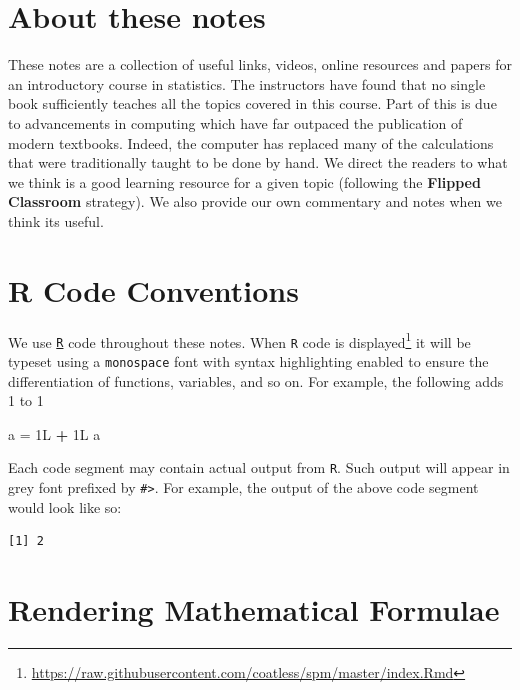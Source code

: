\documentclass[]{book}
\makeatletter
\newenvironment{Shaded}{\begin{snugshade}}{\end{snugshade}}
\newcommand{\StringTok}[1]{\textcolor[rgb]{0.31,0.60,0.02}{#1}}
\newcommand{\OperatorTok}[1]{\textcolor[rgb]{0.81,0.36,0.00}{\textbf{#1}}}
\newcommand{\NormalTok}[1]{#1}
\let\rmarkdownfootnote\footnote%
\def\footnote{\protect\rmarkdownfootnote}
\newenvironment{kframe}{%
\medskip{}
\setlength{\fboxsep}{.8em}
 \def\at@end@of@kframe{}%
 \ifinner\ifhmode%
  \def\at@end@of@kframe{\end{minipage}}%
  \begin{minipage}{\columnwidth}%
 \fi\fi%
 \def\FrameCommand##1{\hskip\@totalleftmargin \hskip-\fboxsep
 \colorbox{shadecolor}{##1}\hskip-\fboxsep
     \hskip-\linewidth \hskip-\@totalleftmargin \hskip\columnwidth}%
 \MakeFramed {\advance\hsize-\width
   \@totalleftmargin\z@ \linewidth\hsize
   \@setminipage}}%
 {\par\unskip\endMakeFramed%
 \at@end@of@kframe}
\renewenvironment{Shaded}{\begin{kframe}}{\end{kframe}}
\theoremstyle{definition}
\theoremstyle{definition}
\theoremstyle{definition}
\theoremstyle{remark}
\makeatother
\begin{document}
\section{About these notes}\label{about-these-notes}

These notes are a collection of useful links, videos, online resources
and papers for an introductory course in statistics. The instructors
have found that no single book sufficiently teaches all the topics
covered in this course. Part of this is due to advancements in computing
which have far outpaced the publication of modern textbooks. Indeed, the
computer has replaced many of the calculations that were traditionally
taught to be done by hand. We direct the readers to what we think is a
good learning resource for a given topic (following the \textbf{Flipped
Classroom} strategy). We also provide our own commentary and notes when
we think its useful.

\section{R Code Conventions}\label{r-code-conventions}

We use \href{https://cran.r-project.org/}{\texttt{R}} code throughout
these notes. When \texttt{R} code is displayed\footnote{\url{https://raw.githubusercontent.com/coatless/spm/master/index.Rmd}}
it will be typeset using a \texttt{monospace} font with syntax
highlighting enabled to ensure the differentiation of functions,
variables, and so on. For example, the following adds 1 to 1

\begin{Shaded}
\begin{Highlighting}[]
\NormalTok{a =}\StringTok{ }\NormalTok{1L }\OperatorTok{+}\StringTok{ }\NormalTok{1L}
\NormalTok{a}
\end{Highlighting}
\end{Shaded}

Each code segment may contain actual output from \texttt{R}. Such output
will appear in grey font prefixed by \texttt{\#\textgreater{}}. For
example, the output of the above code segment would look like so:

\begin{verbatim}
[1] 2
\end{verbatim}

\section{Rendering Mathematical
Formulae}\label{rendering-mathematical-formulae}
\end{document}
